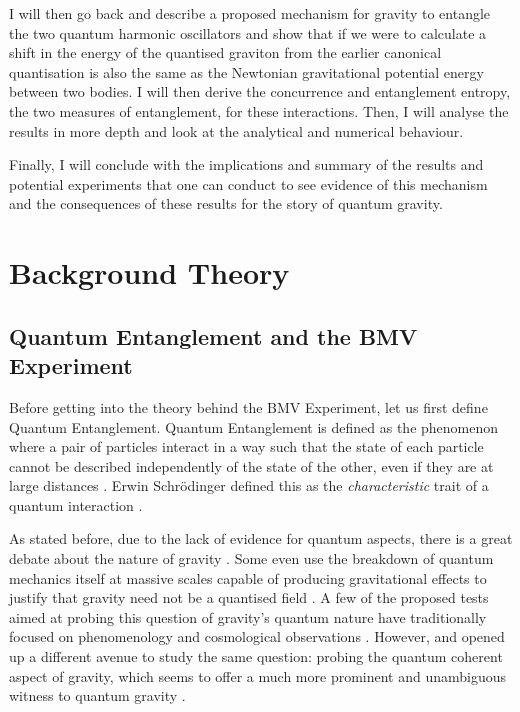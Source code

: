 \documentclass[12pt,a4paper]{report}
\theoremstyle{plain}
\theoremstyle{definition}
\theoremstyle{remark}
\begin{document}
I will then go back and describe a proposed mechanism for gravity to entangle the two quantum harmonic oscillators and show that if we were to calculate a shift in the energy of the quantised graviton from the earlier canonical quantisation is also the same as the Newtonian gravitational potential energy between two bodies. I will then derive the concurrence \cite{Bose_2022} and entanglement entropy, the two measures of entanglement, for these interactions. Then, I will analyse the results in more depth and look at the analytical and numerical behaviour.

Finally, I will conclude with the implications and summary of the results and potential experiments that one can conduct to see evidence of this mechanism and the consequences of these results for the story of quantum gravity.

\newpage
\chapter{Background Theory}
\section{Quantum Entanglement and the BMV Experiment}
Before getting into the theory behind the BMV Experiment, let us first define Quantum Entanglement. Quantum Entanglement is defined as the phenomenon where a pair of particles interact in a way such that the state of each particle cannot be described independently of the state of the other, even if they are at large distances \cite{schrodinger_1935}. Erwin Schr\"odinger defined this as the \textit{characteristic} trait of a quantum interaction \cite{schrodinger_1935}. 

As stated before, due to the lack of evidence for quantum aspects, there is a great debate about the nature of gravity \cite{Bose_2017, fdysongraviton}. Some even use the breakdown of quantum mechanics itself at massive scales capable of producing gravitational effects to justify that gravity need not be a quantised field \cite{penrose}. A few of the proposed tests aimed at probing this question of gravity's quantum nature have traditionally focused on phenomenology and cosmological observations \cite{Bose_2017, Hossenfelder_2012}. However, \citet{Bose_2017} and \citet{Marletto_2017} opened up a different avenue to study the same question: probing the quantum coherent aspect of gravity, which seems to offer a much more prominent and unambiguous witness to quantum gravity \cite{Bose_2017}.
\end{document}
